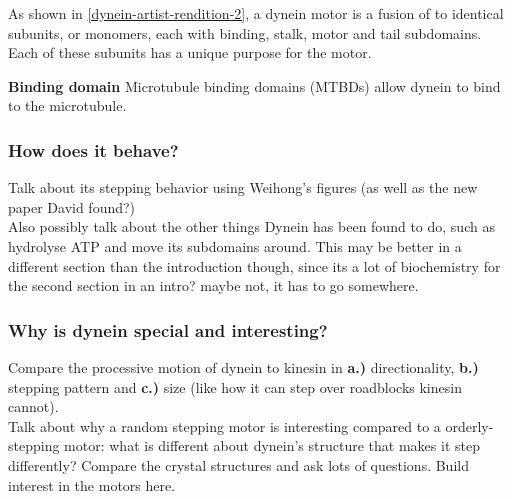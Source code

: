 \documentclass[10pt]{article} %
\begin{document}
As shown in \ref{dynein-artist-rendition-2}, a dynein motor is a fusion of to identical subunits, or monomers, each with binding, stalk, motor and tail subdomains. Each of these subunits has a unique purpose for the motor.

\textbf{Binding domain}
Microtubule binding domains (MTBDs) allow dynein to bind to the microtubule. 


\subsubsection{How does it behave?}
Talk about its stepping behavior using Weihong's figures (as well as the new paper David found?)\\

Also possibly talk about the other things Dynein has been found to do, such as hydrolyse ATP and
move its subdomains around. This may be better in a different section than the introduction though,
since its a lot of biochemistry for the second section in an intro? maybe not, it has to go somewhere.

\subsubsection{Why is dynein special and interesting?}
Compare the processive motion of dynein to kinesin in \textbf{a.)} directionality, \textbf{b.)}
stepping pattern and \textbf{c.)} size (like how it can step over roadblocks kinesin cannot).\\

Talk about why a random stepping motor is interesting compared to a orderly-stepping motor: what
is different about dynein's structure that makes it step differently? Compare the crystal structures
and ask lots of questions. Build interest in the motors here.\\

\end{document}
